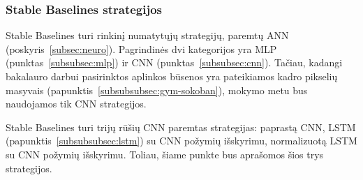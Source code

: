\documentclass{VUMIFPSbakalaurinis}
\begin{document}
\subsubsection{Stable Baselines strategijos}
{
	Stable Baselines turi rinkinį numatytųjų strategijų, paremtų ANN (poskyris~\ref{subsec:neuro}). Pagrindinės dvi kategorijos yra MLP (punktas~\ref{subsubsec:mlp}) ir CNN (punktas~\ref{subsubsec:cnn}). Tačiau, kadangi bakalauro darbui pasirinktos aplinkos būsenos yra pateikiamos kadro pikselių masyvais (papunktis~\ref{subsubsubsec:gym-sokoban}), mokymo metu bus naudojamos tik CNN strategijos.\par
	
	Stable Baselines turi trijų rūšių CNN paremtas strategijas: paprastą CNN, LSTM (papunktis~\ref{subsubsubsec:lstm}) su CNN požymių išskyrimu, normalizuotą LSTM su CNN požymių išskyrimu. Toliau, šiame punkte bus aprašomos šios trys strategijos.
}
\label{subsubsubsec:cnnpolicy}
\end{document}
